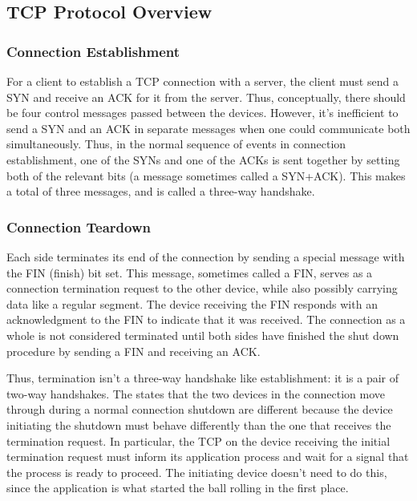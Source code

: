 \documentclass[9pt]{sigplan-proc-varsize}
\begin{document}
\bigskip

\subsection{TCP Protocol Overview}

\subsubsection{Connection Establishment}

For a client to establish a TCP connection with a server, the client must send a SYN and receive an ACK for it from the server. Thus, conceptually, there should be four control messages passed between the devices. However, it's inefficient to send a SYN and an ACK in separate messages when one could communicate both simultaneously. Thus, in the normal sequence of events in connection establishment, one of the SYNs and one of the ACKs is sent together by setting both of the relevant bits (a message sometimes called a SYN+ACK). This makes a total of three messages, and is called a three-way handshake.

\subsubsection{Connection Teardown}

Each side terminates its end of the connection by sending a special message with the FIN (finish) bit set. This message, sometimes called a FIN, serves as a connection termination request to the other device, while also possibly carrying data like a regular segment. The device receiving the FIN responds with an acknowledgment to the FIN to indicate that it was received. The connection as a whole is not considered terminated until both sides have finished the shut down procedure by sending a FIN and receiving an ACK.

Thus, termination isn't a three-way handshake like establishment: it is a pair of two-way handshakes. The states that the two devices in the connection move through during a normal connection shutdown are different because the device initiating the shutdown must behave differently than the one that receives the termination request. In particular, the TCP on the device receiving the initial termination request must inform its application process and wait for a signal that the process is ready to proceed. The initiating device doesn't need to do this, since the application is what started the ball rolling in the first place.
\end{document}
